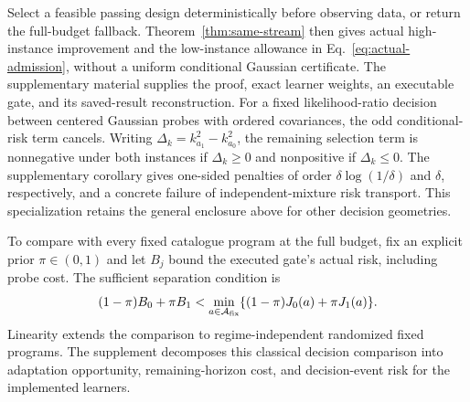 \documentclass[journal]{IEEEtran}
\begin{document}
Select a feasible passing design deterministically before observing data, or return the full-budget fallback.
Theorem~\ref{thm:same-stream} then gives actual high-instance improvement and the low-instance allowance in Eq.~\eqref{eq:actual-admission}, without a uniform conditional Gaussian certificate.
The supplementary material supplies the proof, exact learner weights, an executable gate, and its saved-result reconstruction.
For a fixed likelihood-ratio decision between centered Gaussian probes with ordered covariances, the odd conditional-risk term cancels.
Writing $\Delta_k=k_{a_1}^2-k_{a_0}^2$, the remaining selection term is nonnegative under both instances if $\Delta_k\ge0$ and nonpositive if $\Delta_k\le0$.
The supplementary corollary gives one-sided penalties of order $\delta\log(1/\delta)$ and $\delta$, respectively, and a concrete failure of independent-mixture risk transport.
This specialization retains the general enclosure above for other decision geometries.

To compare with every fixed catalogue program at the full budget, fix an explicit prior $\pi\in(0,1)$ and let $B_j$ bound the executed gate's actual risk, including probe cost.
The sufficient separation condition is
\begin{equation}
(1-\pi)B_0+\pi B_1<\min_{a\in\mathcal A_{\rm fix}}\{(1-\pi)J_0(a)+\pi J_1(a)\}.
\label{eq:fixed-catalogue-separation}
\end{equation}
Linearity extends the comparison to regime-independent randomized fixed programs.
The supplement decomposes this classical decision comparison into adaptation opportunity, remaining-horizon cost, and decision-event risk for the implemented learners.


\end{document}
